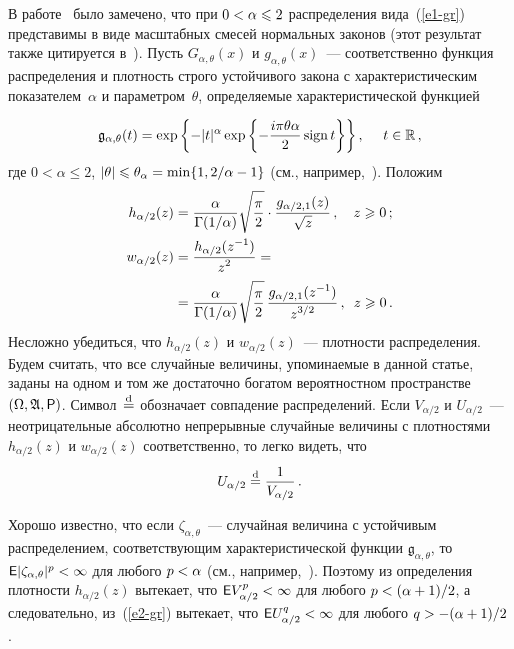 \begin{multicols}{2}
В работе~\cite{West1987} было замечено, что при $0\hm<\alpha\hm\leqslant2$
распределения вида~(\ref{e1-gr}) представимы в виде масштабных смесей нормальных законов 
(этот результат также цитируется в~\cite{ChoySmith1997}). 
%
Пусть 
$G_{\alpha,\theta}(x)$ и $g_{\alpha,\theta}(x)$~--- соответственно функция 
распределения и плотность строго устойчивого закона с характеристическим 
показателем~$\alpha$ и параметром~$\theta$, определяемые характеристической 
функцией
\pagebreak

\noindent
$$
\mathfrak{g}_{\alpha,\theta}(t)=\exp\left\{
-|t|^{\alpha}\exp\left\{-\displaystyle\frac{\displaystyle i\pi\theta\alpha\mathstrut}{\displaystyle 2\mathstrut}\,\mathrm{sign}\,t\right\}\right\},\
\ \ \ t\in\mathbb{R}\,,
$$
где $0<\alpha\leqslant2$,
$|\theta|\hm\leqslant\theta_{\alpha}\hm=\min\{1,{2}/{\alpha}-1\}$ (см., 
например,~\cite{Zolotarev1983}). Положим
\begin{align*}
h_{\alpha/2}(z)&=\displaystyle\frac{\displaystyle \alpha\mathstrut}{\displaystyle \Gamma({1}/{\alpha})\mathstrut}
\sqrt{\displaystyle\frac{\displaystyle \pi\mathstrut}{\displaystyle 2\mathstrut}}\cdot\displaystyle\frac{\displaystyle g_{\alpha/2,1}(z)\mathstrut}{\displaystyle \sqrt{z}\mathstrut}\,,\
\ \ z\geqslant0\,;
\\
w_{\alpha/2}(z)&=\displaystyle\frac{\displaystyle h_{\alpha/2}(z^{-1})\mathstrut}{\displaystyle z^2\mathstrut}={}\\
&{}=\displaystyle\frac{\displaystyle \alpha\mathstrut}{\displaystyle \Gamma({1}/{\alpha})\mathstrut}
\sqrt{\displaystyle\frac{\displaystyle \pi\mathstrut}{\displaystyle 2\mathstrut}}\,\displaystyle\frac{\displaystyle g_{\alpha/2,1}(z^{-1})\mathstrut}{\displaystyle z^{3/2}\mathstrut}\,,\enskip
z\geqslant0\,.
\end{align*}
Несложно убедиться, что $h_{\alpha/2}(z)$ и $w_{\alpha/2}(z)$~---
плотности распределения. Будем считать, что все случайные величины,
упоминаемые в данной статье, заданы на одном и том же достаточно
богатом вероятностном пространстве $(\Omega,\mathfrak{A},{\sf P})$.
Символ~$\stackrel{\mathrm{d}}{=}$ обозначает совпадение распределений. Если
$V_{\alpha/2}$ и $U_{\alpha/2}$~--- неотрицательные абсолютно
непрерывные случайные величины с плотностями $h_{\alpha/2}(z)$ и
$w_{\alpha/2}(z)$ соответственно, то легко видеть, что
\begin{equation}
U_{\alpha/2}\stackrel{\mathrm{d}}{=}\displaystyle\frac{\displaystyle 1\mathstrut}{\displaystyle V_{\alpha/2}\mathstrut}\,.\label{e2-gr}
\end{equation}

Хорошо известно, что если $\zeta_{\alpha,\theta}$~--- случайная
величина с устойчивым распределением, соответствующим
характеристической функции $\mathfrak{g}_{\alpha,\theta}$, то 
${\sf E}|\zeta_{\alpha,\theta}|^p\hm<\infty$ для любого $p\hm<\alpha$ (см.,
например,~\cite{Zolotarev1983}). Поэтому из определения плотности
$h_{\alpha/2}(z)$ вытекает, что ${\sf E}V_{\alpha/2}^p\hm<\infty$ для
любого $p\hm<(\alpha\hm+1)/2$, а следовательно, из~(\ref{e2-gr}) вытекает, что 
${\sf E}U_{\alpha/2}^q\hm<\infty$ для любого $q\hm>-(\alpha\hm+1)/2$.


\end{multicols}
